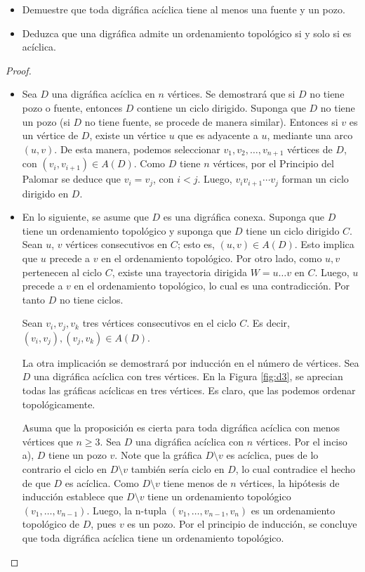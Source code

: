 \documentclass[12pt]{article}
\newenvironment{problem}[2][Problema]{\begin{trivlist}
\item[\hskip \labelsep {\bfseries #1}\hskip \labelsep {\bfseries #2.}]}{\end{trivlist}}
\begin{document}
\begin{problem}{2.1.11}\text{}
\begin{itemize}
    \item[a)] Demuestre que toda digráfica acíclica tiene al menos una fuente y un pozo. 
    \item[b)] Deduzca que una digráfica admite un ordenamiento topológico si y solo si es acíclica. 
\end{itemize}
\end{problem}
\begin{proof}\textbf{ }
\begin{itemize}
    \item[a)] Sea $D$ una digráfica acíclica en $n$ vértices. Se demostrará que si $D$ no tiene pozo o fuente, entonces $D$ contiene un ciclo dirigido. Suponga que $D$ no tiene un pozo (si $D$ no tiene fuente, se procede de manera similar). Entonces si $v$ es un vértice de $D$, existe un vértice $u$ que es adyacente a $u$,  mediante una arco  $(u,v).$ De esta manera, podemos seleccionar $v_1, v_2, \ldots, v_{n+1}$ vértices de $D$, con $(v_i, v_{i+1}) \in A(D).$ Como $D$ tiene $n$ vértices, por el Principio del Palomar se deduce que $v_i = v_j$, con $i < j.$ Luego, $v_i v_{i+1} \cdots v_j$ forman un ciclo dirigido en $D.$
    
    
    \item[b)] En lo siguiente, se asume que $D$ es una digráfica conexa. Suponga que $D$ tiene un ordenamiento topológico y suponga que $D$ tiene un ciclo dirigido $C$. Sean $u$, $v$ vértices consecutivos en $C$; esto es, $(u, v) \in A(D).$ Esto implica que $u$ precede a $v$ en el ordenamiento topológico. Por otro lado, como $u, v$ pertenecen al ciclo $C$, existe una trayectoria dirigida $W = u \ldots v$ en $C.$ Luego, $u$ precede a $v$ en el ordenamiento topológico, lo cual es una contradicción. Por tanto $D$ no tiene ciclos.
    
    
    Sean $v_i, v_j, v_k$ tres vértices consecutivos en el ciclo $C.$ Es decir, $(v_i, v_j), (v_j, v_k) \in A(D).$
    
    
    La otra implicación se demostrará por inducción en el número de vértices. Sea $D$ una digráfica acíclica con tres vértices. En la Figura \ref{fig:d3}, se aprecian todas las gráficas acíclicas en tres vértices. Es claro, que las podemos ordenar topológicamente.
    
    Asuma que la proposición es cierta para toda digráfica acíclica con menos vértices que $n\geq3.$ Sea $D$ una digráfica acíclica con $n$ vértices. Por el inciso a), $D$ tiene un pozo $v$. Note que la gráfica $D \setminus v$ es acíclica, pues de lo contrario el ciclo en $D \setminus v$ también sería ciclo en $D$, lo cual contradice el hecho de que $D$ es acíclica. Como $D\setminus v$ tiene menos de $n$ vértices, la hipótesis de inducción establece que  $D\setminus v$ tiene un ordenamiento topológico $(v_1, \ldots, v_{n-1}).$ Luego, la n-tupla $(v_1, \ldots, v_{n-1}, v_n)$ es un ordenamiento topológico de $D$, pues $v$ es un pozo. Por el principio de inducción, se concluye que toda digráfica acíclica tiene un ordenamiento topológico.
    

\end{itemize}
\end{proof}
\end{document}
